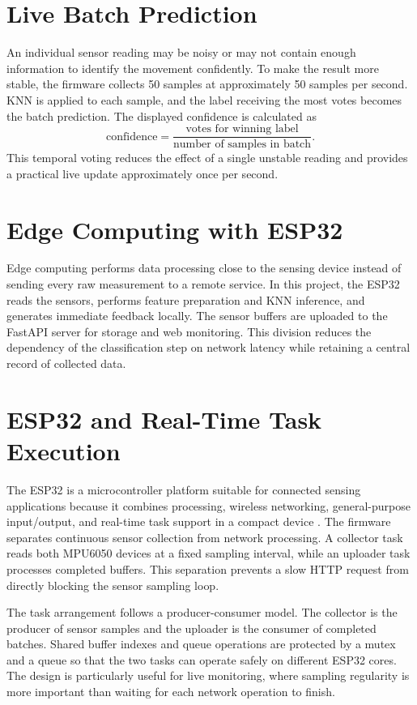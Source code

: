 \section{Live Batch Prediction}
An individual sensor reading may be noisy or may not contain enough information to
identify the movement confidently. To make the result more stable, the firmware
collects 50 samples at approximately 50 samples per second. KNN is applied to each
sample, and the label receiving the most votes becomes the batch prediction. The
displayed confidence is calculated as
\begin{equation}
\text{confidence} = \frac{\text{votes for winning label}}{\text{number of samples in batch}}.
\end{equation}
This temporal voting reduces the effect of a single unstable reading and provides a
practical live update approximately once per second.

\section{Edge Computing with ESP32}
Edge computing performs data processing close to the sensing device instead of
sending every raw measurement to a remote service. In this project, the ESP32 reads
the sensors, performs feature preparation and KNN inference, and generates immediate
feedback locally. The sensor buffers are uploaded to the FastAPI server for storage
and web monitoring. This division reduces the dependency of the classification step
on network latency while retaining a central record of collected data.

\section{ESP32 and Real-Time Task Execution}
The ESP32 is a microcontroller platform suitable for connected sensing applications
because it combines processing, wireless networking, general-purpose input/output,
and real-time task support in a compact device \cite{espressif2024esp32,banzi2022arduino}.
The firmware separates continuous sensor collection from network processing. A
collector task reads both MPU6050 devices at a fixed sampling interval, while an
uploader task processes completed buffers. This separation prevents a slow HTTP
request from directly blocking the sensor sampling loop.

The task arrangement follows a producer-consumer model. The collector is the
producer of sensor samples and the uploader is the consumer of completed batches.
Shared buffer indexes and queue operations are protected by a mutex and a queue so
that the two tasks can operate safely on different ESP32 cores. The design is
particularly useful for live monitoring, where sampling regularity is more important
than waiting for each network operation to finish.

